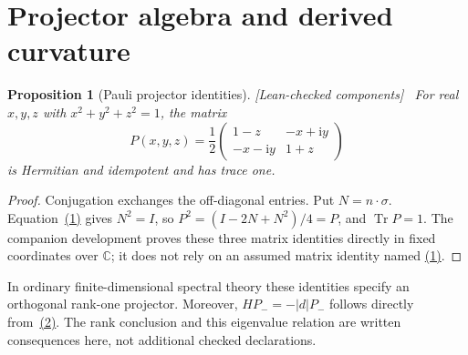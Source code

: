 \documentclass[11pt]{article}
\newtheorem{proposition}[theorem]{Proposition}
\theoremstyle{definition}\newtheorem{definition}[theorem]{Definition}
\theoremstyle{remark}\newtheorem{remark}[theorem]{Remark}
\newcommand{\Tr}{\operatorname{Tr}}
\newcommand{\ii}{\mathrm{i}}
\newcommand{\C}{\mathbb{C}}
\newcommand{\checked}{\textnormal{\small[Lean-checked components]}\ }
\begin{document}
\section{Projector algebra and derived curvature}
\begin{proposition}[Pauli projector identities]\label{prop:projector}\checked
For real $x,y,z$ with $x^2+y^2+z^2=1$, the matrix
\hypertarget{eq:pentries}{}
\begin{equation}
 P(x,y,z)=\frac12\begin{pmatrix}
 1-z&-x+\ii y\\-x-\ii y&1+z
 \end{pmatrix}
\end{equation}
is Hermitian and idempotent and has trace one.
\end{proposition}
\begin{proof}
Conjugation exchanges the off-diagonal entries. Put $N=n\cdot\sigma$. Equation~\hyperref[eq:pauli]{(1)} gives $N^2=I$, so
$P^2=(I-2N+N^2)/4=P$, and $\Tr P=1$.
The companion development proves these three matrix identities directly in fixed coordinates over $\C$; it does not rely on an assumed matrix identity named \hyperref[eq:pauli]{(1)}.
\end{proof}
In ordinary finite-dimensional spectral theory these identities specify an orthogonal rank-one projector. Moreover, $HP_-=-|d|P_-$ follows directly from~\hyperref[eq:h]{(2)}. The rank conclusion and this eigenvalue relation are written consequences here, not additional checked declarations.
\end{document}
